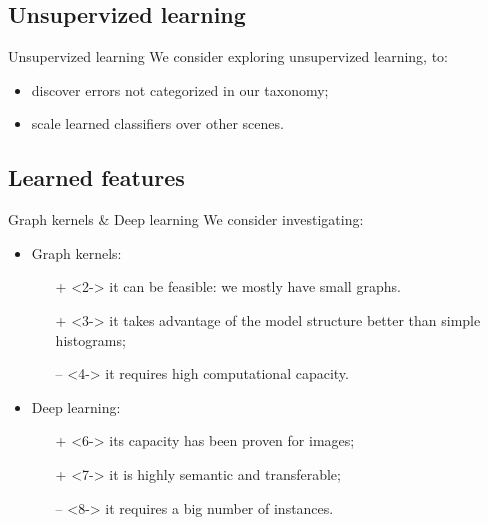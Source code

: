\documentclass{beamer}
\begin{document}
        \subsection{Unsupervized learning}
            \begin{frame}{Unsupervized learning}
                We consider exploring unsupervized learning, to:
                \begin{itemize}[label=$\blacktriangleright$, font=\color{IGNGreen}]
                    \item discover errors not categorized in our taxonomy;
                    \item scale learned classifiers over other scenes.
                \end{itemize}
            \end{frame}
        \subsection{Learned features}
            \begin{frame}{Graph kernels \& Deep learning}
                We consider investigating:
                \begin{itemize}[label=$\blacktriangleright$, font=\color{IGNGreen}]
                    \item<1-> Graph kernels:
                    \begin{itemize}
                        \item[\color{green} +]<2-> it can be feasible: we mostly have small graphs.
                        \item[\color{green} +]<3-> it takes advantage of the model structure better than simple histograms;
                        \item[\color{red} --]<4-> it requires high computational capacity.
                    \end{itemize}
                    \item<5-> Deep learning:
                    \begin{itemize}
                        \item[\color{green} +]<6-> its capacity has been proven for images;
                        \item[\color{green} +]<7-> it is highly semantic and transferable;
                        \item[\color{red} --]<8-> it requires a big number of instances.
                    \end{itemize}
                \end{itemize}
            \end{frame}
\end{document}
